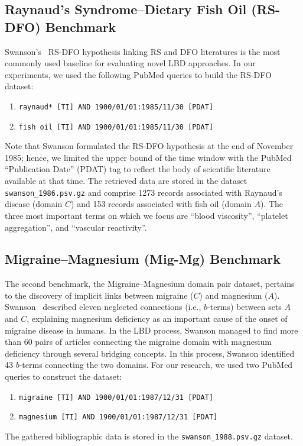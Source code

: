 \documentclass[runningheads]{llncs}
\begin{document}
\subsection{Raynaud's Syndrome--Dietary Fish Oil (RS-DFO) Benchmark}

Swanson's~\cite{swanson1986fish} RS-DFO hypothesis linking RS and DFO literatures is the most commonly used baseline for evaluating novel LBD approaches. In our experiments, we used the following PubMed queries to build the RS-DFO dataset:
\begin{enumerate}
  \item \texttt{raynaud* [TI] AND 1900/01/01:1985/11/30 [PDAT]}
  \item \texttt{fish oil [TI] AND 1900/01/01:1985/11/30 [PDAT]}
\end{enumerate}
Note that Swanson formulated the RS-DFO hypothesis at the end of November 1985; hence, we limited the upper bound of the time window with the PubMed ``Publication Date'' (PDAT) tag to reflect the body of scientific literature available at that time. The retrieved data are stored in the dataset \texttt{swanson\_1986.psv.gz} and comprise 1273 records associated with Raynaud's disease (domain $C$) and 153 records associated with fish oil (domain $A$). The three most important terms on which we focus are ``blood viscosity'', ``platelet aggregation'', and ``vascular reactivity''.

\subsection{Migraine--Magnesium (Mig-Mg) Benchmark}

The second benchmark, the Migraine--Magnesium domain pair dataset, pertains to the discovery of implicit links between migraine ($C$) and magnesium ($A$). Swanson~\cite{swanson1988migraine} described eleven neglected connections (i.e., $b$-terms) between sets $A$ and $C$, explaining magnesium deficiency as an important cause of the onset of migraine disease in humans. In the LBD process, Swanson managed to find more than 60 pairs of articles connecting the migraine domain with magnesium deficiency through several bridging concepts. In this process, Swanson identified 43 $b$-terms connecting the two domains. For our research, we used two PubMed queries to construct the dataset:
\begin{enumerate}
    \item \texttt{migraine [TI] AND 1900/01/01:1987/12/31 [PDAT]}
    \item \texttt{magnesium [TI] AND 1900/01/01:1987/12/31 [PDAT]}
\end{enumerate}
The gathered bibliographic data is stored in the \texttt{swanson\_1988.psv.gz} dataset.
\end{document}
